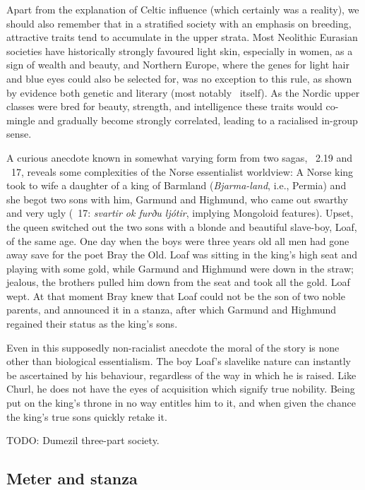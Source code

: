 Apart from the explanation of Celtic influence (which certainly was a reality), we should also remember that in a stratified society with an emphasis on breeding, attractive traits tend to accumulate in the upper strata.  Most Neolithic Eurasian societies have historically strongly favoured light skin, especially in women, as a sign of wealth and beauty, and Northern Europe, where the genes for light hair and blue eyes could also be selected for, was no exception to this rule, as shown by evidence both genetic \parencite{Wilde2014} and literary (most notably \Rigsthula\ itself).  As the Nordic upper classes were bred for beauty, strength, and intelligence these traits would co-mingle and gradually become strongly correlated, leading to a racialised in-group sense.%


A curious anecdote known in somewhat varying form from two sagas, \Landnamabok\ 2.19 and \Halfssaga\ 17, reveals some complexities of the Norse essentialist worldview: A Norse king took to wife a daughter of a king of Barmland (\emph{Bjarma-land}, i.e., Permia) and she begot two sons with him, Garmund and Highmund, who came out swarthy and very ugly (\Halfssaga\ 17: \emph{svartir ok furðu ljótir}, implying Mongoloid features).  Upset, the queen switched out the two sons with a blonde and beautiful slave-boy, Loaf, of the same age.  One day when the boys were three years old all men had gone away save for the poet Bray the Old.  Loaf was sitting in the king’s high seat and playing with some gold, while Garmund and Highmund were down in the straw; jealous, the brothers pulled him down from the seat and took all the gold.  Loaf wept.  At that moment Bray knew that Loaf could not be the son of two noble parents, and announced it in a stanza, after which Garmund and Highmund regained their status as the king’s sons.

Even in this supposedly non-racialist anecdote the moral of the story is none other than biological essentialism.  The boy Loaf’s slavelike nature can instantly be ascertained by his behaviour, regardless of the way in which he is raised.  Like Churl, he does not have the eyes of acquisition which signify true nobility.  Being put on the king’s throne in no way entitles him to it, and when given the chance the king’s true sons quickly retake it.

TODO: Dumezil three-part society.

\subsection{Meter and stanza}

